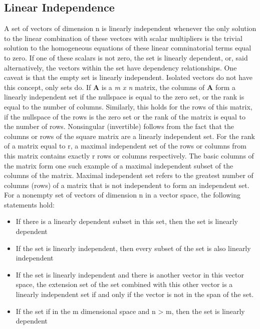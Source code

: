 \documentclass[12pt]{article}
\begin{document}
\subsection{Linear Independence}
A set of vectors of dimension n is linearly independent whenever the only solution to the linear combination of these vectors with scalar multipliers is the trivial solution to the 
homogeneous equations of these linear comninatorial terms equal to zero. If one of these scalars is not zero, the set is linearly dependent, or, said alternatively, the vectors 
within the set have dependency relationships. One caveat is that the empty set is linearly independent. Isolated vectors do not have this concept, only sets do. 
\newline
\newline
If \textbf{A} is a \textit{m x n} matrix, the columns of \textbf{A} form a linearly independent set if the nullspace is equal to the zero set, or the rank is equal to the number of columns. 
Similarly, this holds for the rows of this matrix, if the nullspace of the rows is the zero set or the rank of the matrix is equal to the number of rows. Nonsingular (invertible) follows 
from the fact that the columns or rows of the square matrix are a linearly independent set. 
\newline
\newline
For the rank of a matrix equal to r, a maximal independent set of the rows or columns from this matrix contains exactly r rows or columns respectively. The basic columns of the matrix 
form one such example of a maximal independent subset of the columns of the matrix. Maximal independent set refers to the greatest number of columns (rows) of a matrix that is not 
independent to form an independent set. 
\newline
\newline
For a nonempty set of vectors of dimension n in a vector space, the following statements hold:
\begin{itemize}
    \item If there is a linearly dependent subset in this set, then the set is linearly dependent
    \item If the set is linearly independent, then every subset of the set is also linearly independent
    \item If the set is linearly independent and there is another vector in this vector space, the extension set of the set combined with this other vector is a linearly independent set 
    if and only if the vector is not in the span of the set. 
    \item If the set if in the m dimensional space and n > m, then the set is linearly dependent
\end{itemize}
\end{document}

